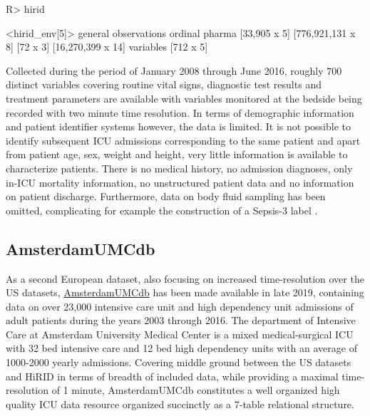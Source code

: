 \documentclass[
  notitle]{jss}
\begin{document}
\begin{CodeChunk}
\begin{CodeInput}
R> hirid
\end{CodeInput}
\begin{CodeOutput}
<hirid_env[5]>
          general      observations           ordinal            pharma 
     [33,905 x 5] [776,921,131 x 8]          [72 x 3] [16,270,399 x 14] 
        variables 
        [712 x 5] 
\end{CodeOutput}
\end{CodeChunk}

Collected during the period of January 2008 through June 2016, roughly
700 distinct variables covering routine vital signs, diagnostic test
results and treatment parameters are available with variables monitored
at the bedside being recorded with two minute time resolution. In terms
of demographic information and patient identifier systems however, the
data is limited. It is not possible to identify subsequent ICU
admissions corresponding to the same patient and apart from patient age,
sex, weight and height, very little information is available to
characterize patients. There is no medical history, no admission
diagnoses, only in-ICU mortality information, no unstructured patient
data and no information on patient discharge. Furthermore, data on body
fluid sampling has been omitted, complicating for example the
construction of a Sepsis-3 label \citep{singer2016}.

\hypertarget{amsterdamumcdb}{%
\subsection{AmsterdamUMCdb}\label{amsterdamumcdb}}

As a second European dataset, also focusing on increased time-resolution
over the US datasets,
\href{https://amsterdammedicaldatascience.nl/\#amsterdamumcdb}{AmsterdamUMCdb}
has been made available in late 2019, containing data on over 23,000
intensive care unit and high dependency unit admissions of adult
patients during the years 2003 through 2016. The department of Intensive
Care at Amsterdam University Medical Center is a mixed medical-surgical
ICU with 32 bed intensive care and 12 bed high dependency units with an
average of 1000-2000 yearly admissions. Covering middle ground between
the US datasets and HiRID in terms of breadth of included data, while
providing a maximal time-resolution of 1 minute, AmsterdamUMCdb
constitutes a well organized high quality ICU data resource organized
succinctly as a 7-table relational structure.
\end{document}
